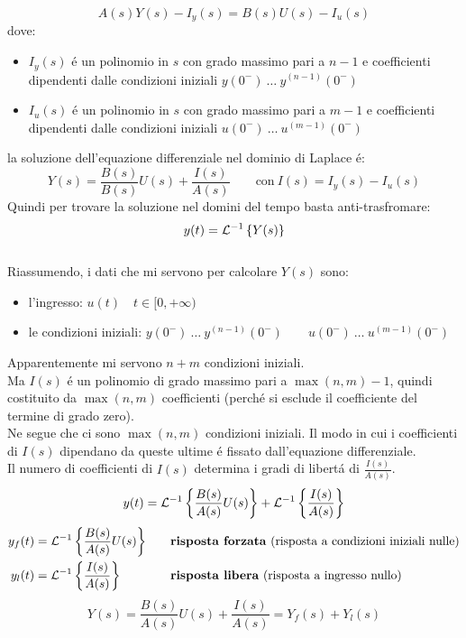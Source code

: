 \documentclass[../main.tex]{subfiles}
\begin{document}
	\[ A(s) Y(s) - I_y(s) = B(s) U(s) - I_u(s) \]
	dove:
	\begin{itemize}
		\item $ I_y(s) $ \'{e} un polinomio in $ s $ con grado massimo pari a $ n-1 $ e coefficienti dipendenti dalle condizioni iniziali $ y(0^-)\ \dots\ y^{(n-1)}(0^-) $
		\item $ I_u(s) $ \'{e} un polinomio in $ s $ con grado massimo pari a $ m-1 $ e coefficienti dipendenti dalle condizioni iniziali $ u(0^-)\ \dots\ u^{(m-1)}(0^-) $
	\end{itemize}
	la soluzione dell'equazione differenziale nel dominio di Laplace \'{e}:
	\begin{equation}
		Y(s) = \frac{B(s)}{B(s)} U(s) + \frac{I(s)}{A(s)} \qquad \text{con}\: I(s) = I_y(s) - I_u(s) 
	\end{equation}
	Quindi per trovare la soluzione nel domini del tempo basta anti-trasfromare:
	\[ y(t) = \mathcal{L}^{-1} \left\lbrace Y(s) \right\rbrace \]
	\smallskip\\
	Riassumendo, i dati che mi servono per calcolare $ Y(s) $ sono:
	\begin{itemize}
		\item l'ingresso: $ u(t) \quad t \in [0, +\infty) $
		\item le condizioni iniziali: $ y(0^-)\ \dots\ y^{(n-1)}(0^-) \qquad u(0^-)\ \dots\ u^{(m-1)}(0^-) $ 
	\end{itemize}
	Apparentemente mi servono $ n+m $ condizioni iniziali.\\
	Ma $ I(s) $ \'{e} un polinomio di grado massimo pari a $ \max(n,m) - 1 $, quindi costituito da $ \max(n,m) $ coefficienti (perch\'{e} si esclude il coefficiente del termine di grado zero).\\
	Ne segue che ci sono $ \max(n,m) $ condizioni iniziali. Il modo in cui i coefficienti di $ I(s) $ dipendano da queste ultime \'{e} fissato dall'equazione differenziale.
	\smallskip\\
	Il numero di coefficienti di $ I(s) $ determina i gradi di libert\'{a} di $ \frac{I(s)}{A(s)} $.
	\[ y(t) = \mathcal{L}^{-1} \left\lbrace  \frac{B(s)}{A(s)} U(s)  \right\rbrace + \mathcal{L}^{-1} \left\lbrace  \frac{I(s)}{A(s)}  \right\rbrace\]
	\begin{align*}
		y_f(t) &= \mathcal{L}^{-1} \left\lbrace  \frac{B(s)}{A(s)} U(s)  \right\rbrace \quad &&\text{\textbf{risposta forzata} (risposta a condizioni iniziali nulle)}\\
		y_l(t) &= \mathcal{L}^{-1} \left\lbrace  \frac{I(s)}{A(s)}  \right\rbrace \quad &&\text{\textbf{risposta libera} (risposta a ingresso nullo)}
	\end{align*}
	\[ Y(s) = \frac{B(s)}{A(s)} U(s) + \frac{I(s)}{A(s)} = Y_f(s) + Y_l(s) \]	
\end{document}
